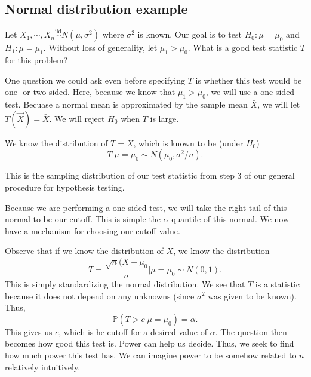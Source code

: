 \documentclass[titlepage, 12pt, leqno]{article}
\begin{document}
\subsection{Normal distribution example}
Let $X_{1}, \cdots , X_{n} \overset{\mathrm{iid}}{\sim}N(\mu, \sigma^{2})$
where $\sigma^{2}$ is known. Our goal is to test $H_{0} : \mu = \mu_{0}$ and
$H_{1} : \mu = \mu_{1}$. Without loss of generality, let $\mu_{1} > \mu_{0}$.
What is a good test statistic $T$ for this problem?

One question we could ask even before specifying $T$ is whether this test would
be one- or two-sided. Here, because we know that $\mu_{1} > \mu_{0}$, we will
use a one-sided test. Becuase a normal mean is approximated by the sample mean
$\bar X$, we will let $T(\vec X)  =\bar X$. We will reject $H_{0}$ when $T$ is
large.

We know the distribution of $T = \bar X$, which is known to be (under $H_{0}$)
\[
    T | \mu = \mu_{0} \sim N(\mu_{0}, \sigma^{2}/n).
\]
\begin{note}
    This is the sampling distribution of our test statistic from step 3 of our
    general procedure for hypothesis testing.
\end{note}

Because we are performing a one-sided test, we will take the right tail of
this normal to be our cutoff. This is simple the $\alpha$ quantile of this
normal. We now have a mechanism for choosing our cutoff value.

Observe that if we know the distribution of $\bar X$, we know the
distribution
\[
    T = \frac{\sqrt{n}(\bar X - \mu_{0}}{\sigma} | \mu = \mu_{0}\sim N(0,1).
\]
This is simply standardizing the normal distribution. We see that $T$ is a
statistic because it does not depend on any unknowns (since $\sigma^{2}$ was
given to be known). Thus,
\[
    \mathbb{P}(T > c|\mu = \mu_{0}) = \alpha.
    \]
This gives us $c$, which is he cutoff for a desired value of $\alpha$. The
question then becomes how good this test is. Power can help us decide. Thus, we
seek to find how much power this test has. We can imagine power to be somehow
related to $n$ relatively intuitively.
\end{document}
